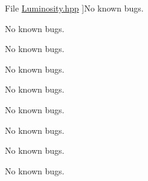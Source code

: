 \begin{DoxyRefList}
%
File \hyperlink{_luminosity_8hpp}{Luminosity.hpp} ]No known bugs.  
\item[\label{bug__bug000012}%
\Hypertarget{bug__bug000012}%
File \hyperlink{_luminosity_8inl}{Luminosity.inl} ]No known bugs.  
\item[\label{bug__bug000025}%
\Hypertarget{bug__bug000025}%
File \hyperlink{_optics_8hpp}{Optics.hpp} ]No known bugs.  
\item[\label{bug__bug000026}%
\Hypertarget{bug__bug000026}%
File \hyperlink{_optics_constants_8hpp}{Optics\+Constants.hpp} ]No known bugs.  
\item[\label{bug__bug000013}%
\Hypertarget{bug__bug000013}%
File \hyperlink{_orbital_charecteristics_8hpp}{Orbital\+Charecteristics.hpp} ]No known bugs.  
\item[\label{bug__bug000014}%
\Hypertarget{bug__bug000014}%
File \hyperlink{_orbital_charecteristics_8inl}{Orbital\+Charecteristics.inl} ]No known bugs.  
\item[\label{bug__bug000009}%
\Hypertarget{bug__bug000009}%
File \hyperlink{_periapsis_8hpp}{Periapsis.hpp} ]No known bugs. 

No known bugs.  
\item[\label{bug__bug000010}%
\Hypertarget{bug__bug000010}%
File \hyperlink{_periapsis_8inl}{Periapsis.inl} ]No known bugs. 


\end{DoxyRefList}
